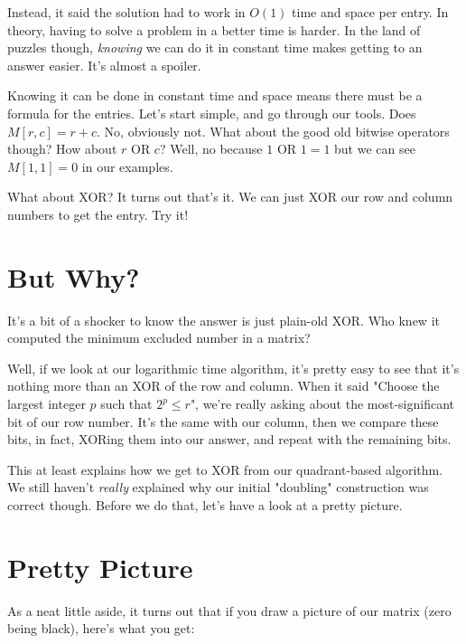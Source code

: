 \documentclass[11pt]{article}
\begin{document}
Instead, it said the solution had to work in $O(1)$ time and space per entry. In theory, having to solve a problem in a better time is harder. In the land of puzzles though, \emph{knowing} we can do it in constant time makes getting to an answer easier. It's almost a spoiler.

Knowing it can be done in constant time and space means there must be a formula for the entries. Let's start simple, and go through our tools. Does $M[r, c] = r + c$. No, obviously not. What about the good old bitwise operators though? How about $r \mbox{ OR } c$? Well, no because $1 \mbox{ OR } 1 = 1$ but we can see $M[1, 1] = 0$ in our examples.

What about XOR? It turns out that's it. We can just XOR our row and column numbers to get the entry. Try it!
\section{But Why?}

It's a bit of a shocker to know the answer is just plain-old XOR. Who knew it computed the minimum excluded number in a matrix?

Well, if we look at our logarithmic time algorithm, it's pretty easy to see that it's nothing more than an XOR of the row and column. When it said "Choose the largest integer $p$ such that $2^p \leq r$", we're really asking about the most-significant bit of our row number. It's the same with our column, then we compare these bits, in fact, XORing them into our answer, and repeat with the remaining bits.

This at least explains how we get to XOR from our quadrant-based algorithm. We still haven't \emph{really} explained why our initial "doubling" construction was correct though. Before we do that, let's have a look at a pretty picture.
\section{Pretty Picture}

As a neat little aside, it turns out that if you draw a picture of our matrix (zero being black), here's what you get:

\begin{center}\end{center}
\end{document}

